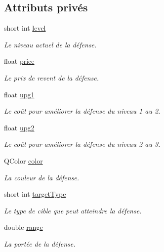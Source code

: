 \subsection*{Attributs privés}
\begin{DoxyCompactItemize}
\item 
short int \hyperlink{classTower_a4a719d8065544dd9e0285424cae755bb}{level}
\begin{DoxyCompactList}\small\item\em Le niveau actuel de la défense. \end{DoxyCompactList}\item 
float \hyperlink{classTower_ab0899f8dc1ce4d15d9c27df3c3a9609d}{price}
\begin{DoxyCompactList}\small\item\em Le prix de revent de la défense. \end{DoxyCompactList}\item 
float \hyperlink{classTower_a141e6c72b5190821851e02a5ca412535}{upg1}
\begin{DoxyCompactList}\small\item\em Le coût pour améliorer la défense du niveau 1 au 2. \end{DoxyCompactList}\item 
float \hyperlink{classTower_a53ab9046925a4c9b403fb41b0ca4a5d4}{upg2}
\begin{DoxyCompactList}\small\item\em Le coût pour améliorer la défense du niveau 2 au 3. \end{DoxyCompactList}\item 
QColor \hyperlink{classTower_abd813990a1ae3b4300a54b38db0e1c51}{color}
\begin{DoxyCompactList}\small\item\em La couleur de la défense. \end{DoxyCompactList}\item 
short int \hyperlink{classTower_a7d2457327dd9be1bd9840f0654c3b76f}{targetType}
\begin{DoxyCompactList}\small\item\em Le type de cible que peut atteindre la défense. \end{DoxyCompactList}\item 
double \hyperlink{classTower_a435abff8e426dcff8d0650f663417a71}{range}
\begin{DoxyCompactList}\small\item\em La portée de la défense. \end{DoxyCompactList}\item 

\end{DoxyCompactItemize}
